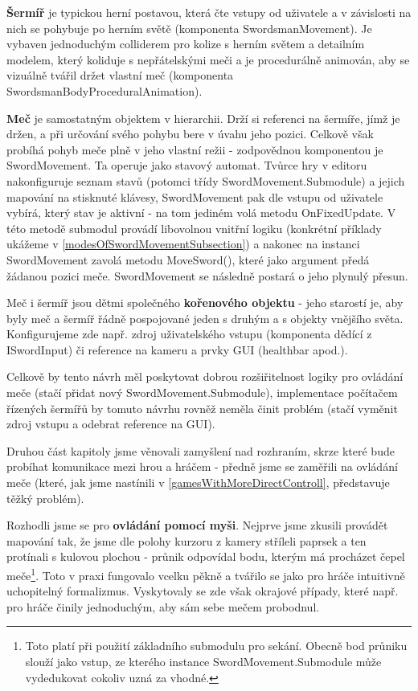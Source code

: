 \textbf{Šermíř} je typickou herní postavou, která čte vstupy od uživatele a v závislosti na nich se pohybuje po herním světě (komponenta SwordsmanMovement). Je vybaven jednoduchým colliderem pro kolize s herním světem a detailním modelem, který koliduje s nepřátelskými meči a je procedurálně animován, aby se vizuálně tvářil držet vlastní meč (komponenta SwordsmanBodyProceduralAnimation). 

\textbf{Meč} je samostatným objektem v hierarchii. Drží si referenci na šermíře, jímž je držen, a při určování svého pohybu bere v úvahu jeho pozici. Celkově však probíhá pohyb meče plně v jeho vlastní režii - zodpovědnou komponentou je SwordMovement. Ta operuje jako stavový automat. Tvůrce hry v editoru nakonfiguruje seznam stavů (potomci třídy SwordMovement.Submodule) a jejich mapování na stisknuté klávesy, SwordMovement pak dle vstupu od uživatele vybírá, který stav je aktivní - na tom jediném volá metodu OnFixedUpdate. V této metodě submodul provádí libovolnou vnitřní logiku (konkrétní příklady ukážeme v \ref{modesOfSwordMovementSubsection}) a nakonec na instanci SwordMovement zavolá metodu MoveSword(), které jako argument předá žádanou pozici meče. SwordMovement se následně postará o jeho plynulý přesun. 

Meč i šermíř jsou dětmi společného \textbf{kořenového objektu} - jeho starostí je, aby byly meč a šermíř řádně pospojované jeden s druhým a s objekty vnějšího světa. Konfigurujeme zde např. zdroj uživatelského vstupu (komponenta dědící z ISwordInput) či reference na kameru a prvky GUI (healthbar apod.).

Celkově by tento návrh měl poskytovat dobrou rozšiřitelnost logiky pro ovládání meče (stačí přidat nový SwordMovement.Submodule), implementace počítačem řízených šermířů by tomuto návrhu rovněž neměla činit problém (stačí vyměnit zdroj vstupu a odebrat reference na GUI).

\bigbreak

Druhou část kapitoly jsme věnovali zamyšlení nad rozhraním, skrze které bude probíhat komunikace mezi hrou a hráčem - předně jsme se zaměřili na ovládání meče (které, jak jsme nastínili v \ref{gamesWithMoreDirectControll}, představuje těžký problém).

Rozhodli jsme se pro \textbf{ovládání pomocí myši}. Nejprve jsme zkusili provádět mapování tak, že jsme dle polohy kurzoru z kamery stříleli paprsek a ten protínali s kulovou plochou - průnik odpovídal bodu, kterým má procházet čepel meče\footnote{Toto platí při použití základního submodulu pro sekání. Obecně bod průniku slouží jako vstup, ze kterého instance SwordMovement.Submodule může vydedukovat cokoliv uzná za vhodné.}. Toto v praxi fungovalo vcelku pěkně a tvářilo se jako pro hráče intuitivně uchopitelný formalizmus. Vyskytovaly se zde však okrajové případy, které např. pro hráče činily jednoduchým, aby sám sebe mečem probodnul.

